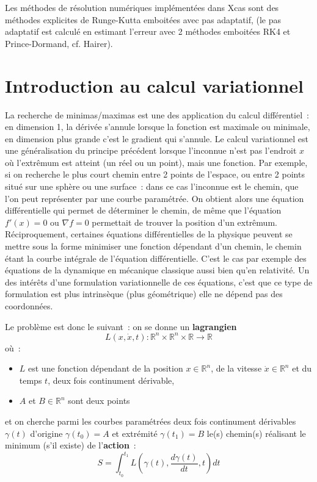 \documentclass[a4paper,11pt]{article}
\newcommand{\R}{{\mathbb{R}}}
\begin{document}
\begin{giacjshere}
Les méthodes de résolution numériques implémentées dans Xcas sont
des méthodes explicites de Runge-Kutta emboitées avec pas adaptatif, 
(le pas adaptatif est calcul\'e en estimant l'erreur 
avec 2 méthodes emboitées RK4 et
Prince-Dormand, cf. Hairer).


\section{Introduction au calcul variationnel} \label{sec:lagrangien}
La recherche de minimas/maximas est une des application 
du calcul diff\'erentiel~: en dimension 1, la d\'eriv\'ee s'annule
lorsque la fonction est maximale ou minimale, en dimension plus
grande c'est le gradient qui s'annule. Le calcul variationnel
est une g\'en\'eralisation du principe pr\'ec\'edent lorsque
l'inconnue n'est pas l'endroit $x$ o\`u l'extr\^emum est atteint
(un r\'eel ou un point), mais une fonction. Par exemple, si on recherche
le plus court chemin entre 2 points de l'espace, ou entre 2 points
situ\'e sur une sph\`ere ou une surface~: dans ce cas l'inconnue
est le chemin, que l'on peut repr\'esenter par une courbe 
param\'etr\'ee. On obtient alors une \'equation diff\'erentielle
qui permet de d\'eterminer le chemin, de m\^eme que l'\'equation
$f'(x)=0$ ou $\nabla f=0$ permettait de trouver la position
d'un extr\^emum. R\'eciproquement, certaines \'equations
diff\'erentielles de la physique peuvent se mettre sous la forme minimiser une
fonction d\'ependant d'un chemin, le chemin \'etant la courbe
int\'egrale de l'\'equation diff\'erentielle. C'est le cas par
exemple des \'equations de la dynamique en m\'ecanique
classique aussi bien qu'en relativit\'e. Un des int\'er\^ets d'une
formulation variationnelle de ces \'equations, c'est que ce type
de formulation est plus intrins\`eque (plus g\'eom\'etrique) 
elle ne d\'epend pas des coordonn\'ees.

Le probl\`eme est donc le suivant~: on se donne un 
{\bf lagrangien}
$$L(x,\dot{x},t): \R^n \times \R^n \times \R \rightarrow \R$$ 
o\`u~:
\begin{itemize}
\item $L$ est une fonction d\'ependant de la position $x \in \R^n$,
de la vitesse $\dot{x} \in \R^n$ et du temps $t$,
deux fois continument d\'erivable,
\item $A$ et $B \in \R^n$ sont deux points
\end{itemize}
et on cherche parmi les courbes param\'etr\'ees
deux fois continument d\'erivables
$\gamma(t)$ d'origine $\gamma(t_0)=A$ 
et extr\'emit\'e $\gamma(t_1)=B$ le(s) chemin(s) r\'ealisant le
minimum (s'il existe) de l'{\bf action}~:
$$ S=\int_{t_0}^{t_1} L(\gamma(t),\frac{d\gamma(t)}{dt},t) dt $$


\end{giacjshere}
\end{document}
